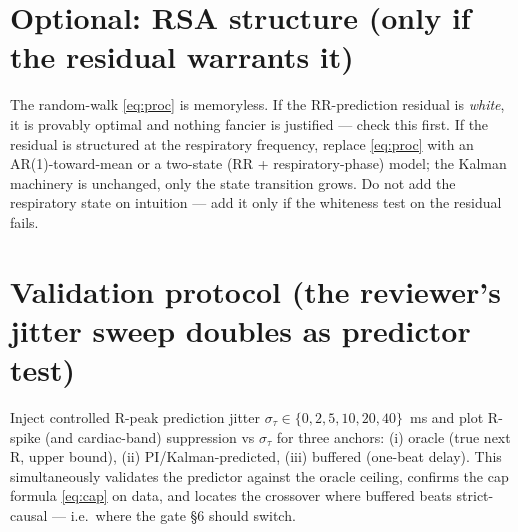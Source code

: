 \documentclass[11pt]{article}
\begin{document}
\section{Optional: RSA structure (only if the residual warrants it)}

The random-walk \eqref{eq:proc} is memoryless. If the RR-prediction residual is \emph{white}, it is
provably optimal and nothing fancier is justified --- check this first. If the residual is structured
at the respiratory frequency, replace \eqref{eq:proc} with an AR(1)-toward-mean or a two-state
(RR + respiratory-phase) model; the Kalman machinery is unchanged, only the state transition grows.
Do not add the respiratory state on intuition --- add it only if the whiteness test on the residual
fails.

\section{Validation protocol (the reviewer's jitter sweep doubles as predictor test)}

Inject controlled R-peak prediction jitter $\sigma_\tau \in \{0,2,5,10,20,40\}$~ms and plot R-spike
(and cardiac-band) suppression vs $\sigma_\tau$ for three anchors: (i) oracle (true next R, upper
bound), (ii) PI/Kalman-predicted, (iii) buffered (one-beat delay). This simultaneously validates the
predictor against the oracle ceiling, confirms the cap formula \eqref{eq:cap} on data, and locates
the crossover where buffered beats strict-causal --- i.e.\ where the gate \S6 should switch.
\end{document}
